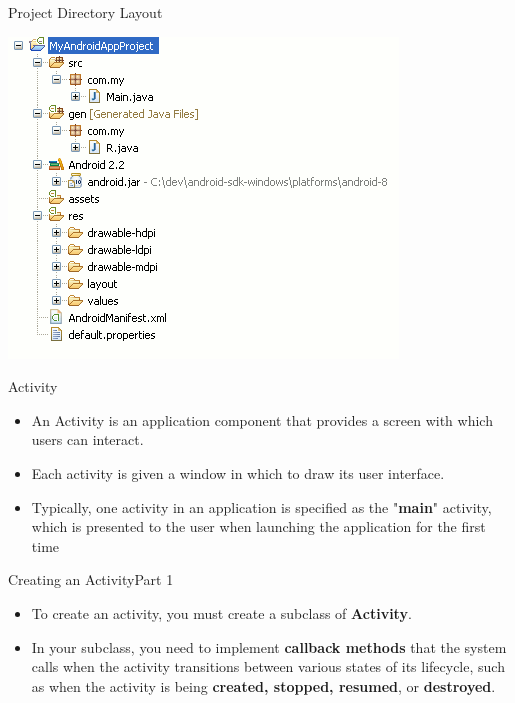 \begin{frame}{Project Directory Layout}
\begin{center}
\includegraphics[scale=0.5]{images/project}
\end{center}
\end{frame}

\begin{frame}{Activity}
\begin{itemize}
    \item An Activity is an application component that
provides a screen with which users can
interact.
    \item Each activity is given a window in which to
draw its user interface.
    \item Typically, one activity in an application is
specified as the "\textbf{main}" activity, which is
presented to the user when launching the
application for the first time 
\end{itemize}
\end{frame}

\begin{frame}{Creating an Activity}{Part 1}
\begin{itemize}
    \item To create an activity, you must create a subclass of
\textbf{Activity}.
    \item In your subclass, you need to implement \textbf{callback
methods} that the system calls when the activity
transitions between various states of its lifecycle, such
as when the activity is being \textbf{created, stopped, resumed},
or \textbf{destroyed}.
\end{itemize}
\end{frame}


